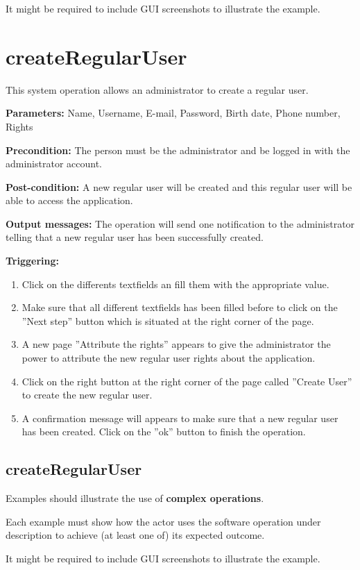It might be required to include GUI screenshots to illustrate the example.







\section{createRegularUser}
\label{operation:createRegularUser}
This system operation allows an administrator to create a regular user.

\begin{description}

\item \textbf{Parameters:} Name, Username, E-mail, Password, Birth date, Phone
number, Rights
\item \textbf{Precondition:} The person must be the administrator and be logged
in with the administrator account.
\item \textbf{Post-condition:} A new regular user will be created and this
regular user will be able to access the application.
\item \textbf{Output messages:} The operation will send one notification to the
administrator telling that a new regular user has been successfully created.


\item \textbf{Triggering:}
\begin{enumerate}
\item Click on the differents textfields an fill them with the appropriate
value.
\item Make sure that all different textfields has been filled before to
click on the ''Next step'' button which is situated at the right corner of the
page.
\item A new page ''Attribute the rights'' appears to give the administrator the
power to attribute the new regular user rights about the application.
\item Click on the right button at the right corner of the page called
''Create User'' to create the new regular user.
\item A confirmation message will appears to make sure that a new regular user
has been created. Click on the ''ok'' button to finish the operation.
\end{enumerate}

 
\end{description}

 
\subsection{createRegularUser}
Examples should illustrate the use of \textbf{complex operations}.

Each example must show how the actor uses the software operation under
description to achieve (at least one of) its expected outcome.

It might be required to include GUI screenshots to illustrate the example.
